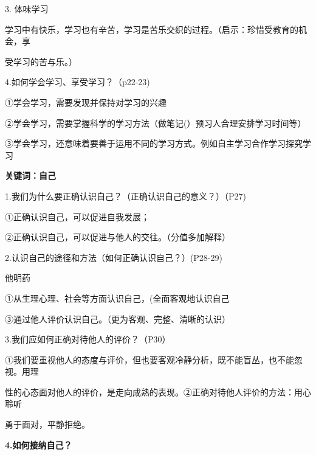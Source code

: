 \documentclass[lang=cn,11pt]{elegantbook}
\newcommand{\daofasym}[1]{{\daofasymbolfont #1}}
\newcommand{\daofasym}[1]{#1}
\begin{document}
3. 体味学习\par

学习中有快乐，学习也有辛苦，学习是苦乐交织的过程。（启示：珍惜受教育的机会，享\par

受学习的苦与乐。）\par

4.如何学会学习、享受学习？（p22-23)\par

\daofasym{①}学会学习，需要发现并保持对学习的兴趣\par

\daofasym{②}学会学习，需要掌握科学的学习方法（做笔记(）预习人合理安排学习时间等）\par

\daofasym{③}学会学习，还意味着要善于运用不同的学习方式。例如自主学习合作学习探究学习\par

\textbf{关键词：自己}\par

1.我们为什么要正确认识自己？（正确认识自己的意义？）（P27)\par

\daofasym{①}正确认识自己，可以促进自我发展；\par

\daofasym{②}正确认识自己，可以促进与他人的交往。（分值多加解释）\par

2.认识自己的途径和方法（如何正确认识自己？）(P28-29)\par

他明药\par

\daofasym{①}从生理心理、社会等方面认识自己，(全面客观地认识自己\par

\daofasym{③}通过他人评价认识自己。（更为客观、完整、清晰的认识）\par

3.我们应如何正确对待他人的评价？（P30）\par

\daofasym{①}我们要重视他人的态度与评价，但也要客观冷静分析，既不能盲丛，也不能忽视。用理\par

性的心态面对他人的评价，是走向成熟的表现。\daofasym{②}正确对待他人评价的方法：用心聆听\par

勇于面对，平静拒绝。\par

\textbf{4.如何接纳自己？}\par
\end{document}
